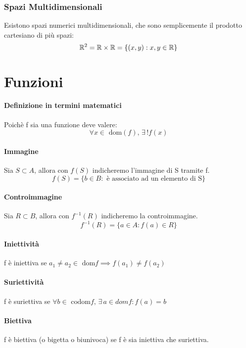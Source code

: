     \subsubsection*{Spazi Multidimensionali}
    Esistono spazi numerici multidimensionali, che sono semplicemente il prodotto cartesiano di più spazi:
    \[ \mathbb{R}^2 = \mathbb{R} \times \mathbb{R} = \{ (x,y):x,y\in \mathbb{R}\}\]

    \section*{Funzioni}
    \paragraph*{Definizione in termini matematici} Poichè f sia una funzione deve valere:
    \[ \forall x \in \text{ dom}(f),\, \exists \, ! f(x) \]
    \paragraph*{Immagine}Sia $S \subset A$, allora con $f(S)$ indicheremo l'immagine di S tramite f.
    \[ f(S)=\{b \in B: \text{ è associato ad un elemento di S}\} \]
    \paragraph*{Controimmagine} Sia $R \subset B$, allora con $f^{-1}(R)$ indicheremo la controimmagine.
    \[ f^{-1}(R)=\{a \in A: f(a) \in R \} \]
    \paragraph*{Iniettività} f è iniettiva se $ a_1 \neq a_2 \in \text{ dom}f \implies f(a_1) \neq f(a_2)$
    \paragraph*{Suriettività} f è suriettiva se $\forall b \in \text{ codom}f, \, \exists \, a \in dom f:f(a)=b$
    \paragraph*{Biettiva} f è biettiva (o bigetta o biunivoca) se f è sia iniettiva che suriettiva.

